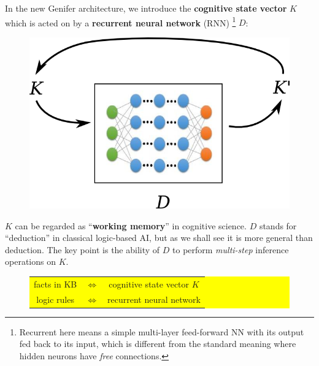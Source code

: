 \documentclass[12pt]{article}
\begin{document}
In the new Genifer architecture, we introduce the \textbf{cognitive state vector} $K$ which is acted on by a \textbf{recurrent neural network} (RNN) \footnote{Recurrent here means a simple multi-layer feed-forward NN with its output fed back to its input, which is different from the standard meaning where hidden neurons have \textit{free} connections.} $D$:
\begin{figure}[H]
\centering
\includegraphics[scale=0.75]{reasoner-model.png}
\end{figure}
$K$ can be regarded as ``\textbf{working memory}'' in cognitive science.  $D$ stands for ``deduction'' in classical logic-based AI, but as we shall see it is more general than deduction.  The key point is the ability of $D$ to perform \textit{multi-step} inference operations on $K$.

\begin{figure}[H]
\centering
\colorbox{yellow}{\parbox{0.7\textwidth}{
\begin{tabular}{ccc}
facts in KB & $\Leftrightarrow$ & cognitive state vector $K$ \\
logic rules & $\Leftrightarrow$ & recurrent neural network \\
\end{tabular}
}}
\end{figure}
\end{document}
